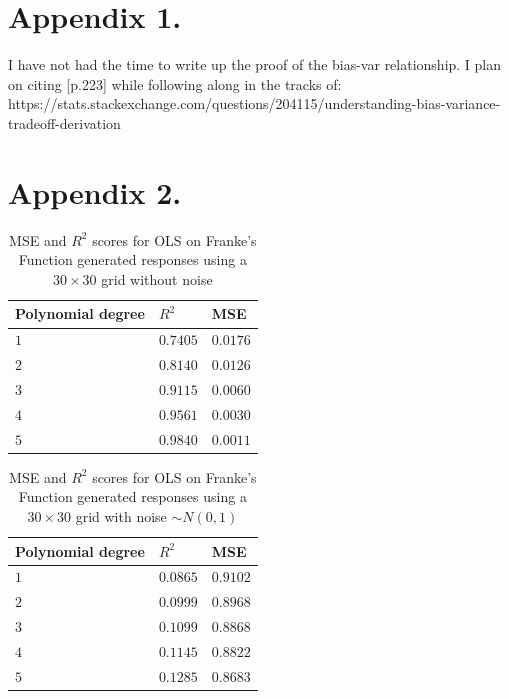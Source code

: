 \documentclass[%
oneside,                 %
final,                   %
10pt]{article}
\begin{document}
\begin{appendices}
\section*{Appendix 1.} \label{APP_1}
I have not had the time to write up the proof of the bias-var relationship. I plan on citing \citep{HastieTrevor2009TEoS}[p.223] while following along in the tracks of: https://stats.stackexchange.com/questions/204115/understanding-bias-variance-tradeoff-derivation

\section*{Appendix 2.} \label{APP_2}
\begin{table}[h!]
\begin{center}
\begin{tabular}{lll}
\hline
 Polynomial degree   & $R^2$      & MSE        \\
\hline
 $ 1 $               & $ 0.7405 $ & $ 0.0176 $ \\
 $ 2 $               & $ 0.8140 $ & $ 0.0126 $ \\
 $ 3 $               & $ 0.9115 $ & $ 0.0060 $ \\
 $ 4 $               & $ 0.9561 $ & $ 0.0030 $ \\
 $ 5 $               & $ 0.9840 $ & $ 0.0011 $ \\
\hline
\end{tabular}
\end{center}
\caption{MSE and $R^2$ scores for OLS on  Franke's Function generated responses using a $30\times 30$ grid without noise}
\label{table:OLS_mse_r2}
\end{table}

\begin{table}[h!]
\begin{center}
\begin{tabular}{lll}
\hline
 Polynomial degree   & $R^2$      & MSE        \\
\hline
 $ 1 $               & $ 0.0865 $ & $ 0.9102 $ \\
 $ 2 $               & $ 0.0999 $ & $ 0.8968 $ \\
 $ 3 $               & $ 0.1099 $ & $ 0.8868 $ \\
 $ 4 $               & $ 0.1145 $ & $ 0.8822 $ \\
 $ 5 $               & $ 0.1285 $ & $ 0.8683 $ \\
\hline
\end{tabular}
\end{center}
\caption{MSE and $R^2$ scores for OLS on  Franke's Function generated responses using a $30\times 30$ grid with noise $\sim N(0,1)$ }
\label{table:OLS_mse_r2}
\end{table}



\end{appendices}
\end{document}
